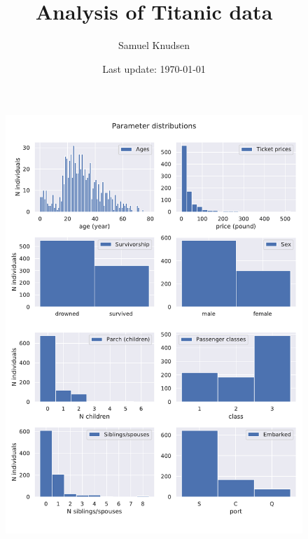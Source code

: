 \documentclass{book}
\title{Analysis of Titanic data}
\author{Samuel Knudsen} %
\date{Last update: \today}
\begin{document}
\maketitle



\begin{figure}
    \centering
    \includegraphics[scale=0.67]{../figs/distributions.pdf}%
\end{figure}


\clearpage
\end{document}

